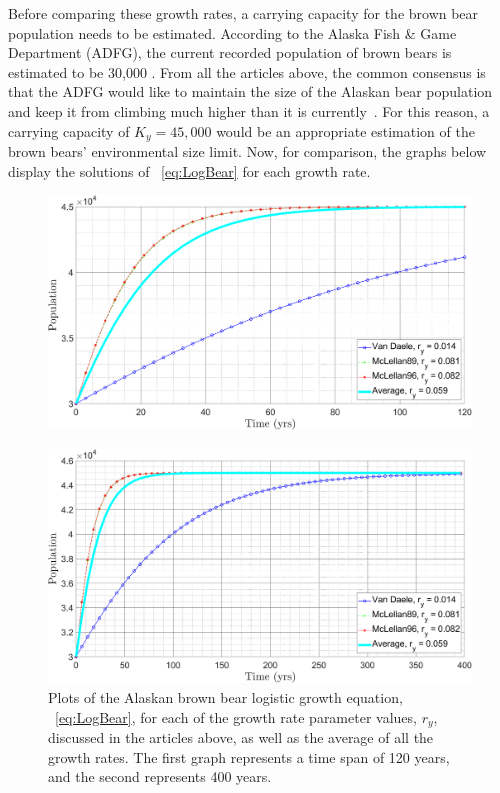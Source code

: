 Before comparing these growth rates, a carrying capacity for the brown bear population needs to be estimated.
According to the Alaska Fish \& Game Department (ADFG), the current recorded population of brown bears is estimated to be 30,000 \cite{ADFG}.
From all the articles above, the common consensus is that the ADFG would like to maintain the size of the Alaskan bear population and keep it from climbing much higher than it is currently~\cite{mclellan1989,mclellan1996,daele2010management}.
For this reason, a carrying capacity of $K_y=45,000$ would be an appropriate estimation of the brown bears' environmental size limit.
Now, for comparison, the graphs below display the solutions of \equationautorefname~\eqref{eq:LogBear} for each growth rate.
\begin{figure}[H]
    \centering
    \includegraphics[width=14cm]{Pictures/Bear Pop/different growth rates.png}
\end{figure}
\begin{figure}[H]
    \centering
    \includegraphics[width=14cm]{Pictures/Bear Pop/different growth rates large.png}
    \caption{\singlespacing
    Plots of the Alaskan brown bear logistic growth equation, \equationautorefname~\eqref{eq:LogBear}, for each of the growth rate parameter values, $r_y$, discussed in the articles above, as well as the average of all the growth rates. 
    The first graph represents a time span of 120 years, and the second represents 400 years.}
    
    \label{fig:LogGrowthTrials}
\end{figure}

